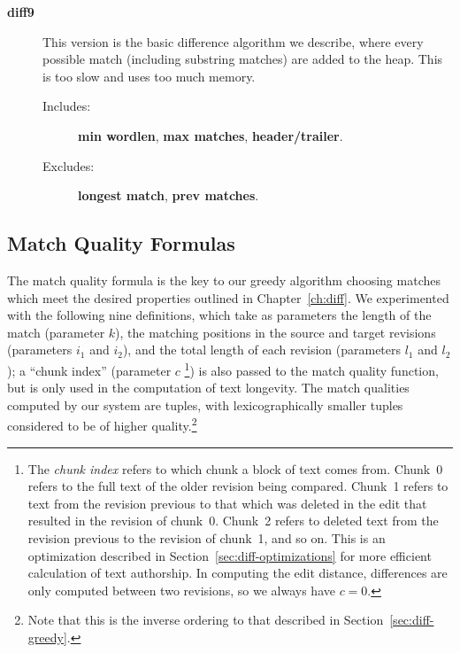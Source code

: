 \begin{description}
\item[\textbf{diff9}]
    This version is the basic difference algorithm we describe,
    where every possible match (including substring matches) are
    added to the heap.  This is too slow and uses too much memory.
    \begin{description}
    \item[Includes:]
	\textbf{min wordlen}, \textbf{max matches},
	\textbf{header/trailer}.
    \item[Excludes:]
	\textbf{longest match}, \textbf{prev matches}.
    \end{description}

\end{description}



\subsection{Match Quality Formulas}

The match quality formula is the key to our greedy algorithm
choosing matches which meet the desired properties outlined
in Chapter~\ref{ch:diff}.
We experimented with the following nine definitions,
which take as parameters the length of the match (parameter $k$),
the matching positions in the source and target revisions
(parameters $i_1$ and $i_2$), and the total length of
each revision (parameters $l_1$ and $l_2$);
a ``chunk index'' (parameter $c$
\footnote{The \textit{chunk index} refers
to which chunk a block of text comes from.
Chunk~0 refers to the full text of the older revision being compared.
Chunk~1 refers to text from the revision previous to that which was
deleted in the edit that resulted in the revision of chunk~0.
Chunk~2 refers to deleted text from the revision previous to the
revision of chunk~1, and so on.
This is an optimization described in Section~\ref{sec:diff-optimizations}
for more efficient calculation of text authorship.
In computing the edit distance, differences are only computed
between two revisions, so we always have $c=0$.
}) is also passed to the match quality function,
but is only used in the computation of text longevity.
The match qualities computed by our system are tuples,
with lexicographically smaller tuples considered to be
of higher quality.\footnote{Note that this is the inverse ordering
to that described in Section~\ref{sec:diff-greedy}.}


